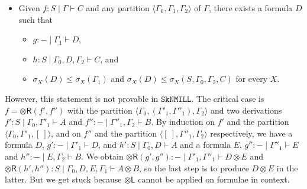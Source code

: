 \documentclass[sn-mathphys-num]{sn-jnl}%
\newcommand{\GG}{\Gamma}
\newcommand{\vd}{\vdash}
\newcommand{\tl}{\otimes \mathsf{L}}
\newcommand{\tr}{\otimes\mathsf{R}}
\newcommand{\ot}{\otimes}
\newcommand{\SkNMILL}{$\mathtt{SkNMILL}$}
\newcommand{\mf}[1]{\mathsf{#1}}
\newcommand{\gs}[1]{\sigma_{X} (#1)}
\theoremstyle{thmstyleone}%
\theoremstyle{thmstyletwo}%
\theoremstyle{thmstylethree}%
\begin{document}
\begin{itemize}
  \item[\ ] Given $f: S \mid \Gamma \vd C$ and any partition $\langle \GG_0,\GG_1, \GG_2 \rangle$ of $\GG$, there exists a formula $D$ such that 
  \begin{itemize}
    \item[--] $g : {-} \mid \GG_1 \vd D$,
    \item[--] $h : S \mid \GG_0, D, \GG_2 \vd C$, and
    \item[--] $\gs{D} \leq \gs{\GG_1}$ and $\gs{D} \leq \gs{S , \GG_0 , \GG_2 , C}$ for every $X$.    
  \end{itemize}
\end{itemize}
However, this statement is not provable in \SkNMILL.
The critical case is $f = \tr (f',f'')$ with the partition $\langle \GG_0, (\GG'_1, \GG''_1), \GG_2\rangle$ and two derivations $f' : S \mid \GG_0 , \GG'_1 \vd A$ and $f'' : {-} \mid \GG''_1 , \GG_2 \vd B$.
By induction on $f'$ and the partition $\langle \GG_0 , \GG'_1, [\ ] \rangle$, and on $f''$ and the partition $\langle [\ ], \GG''_1, \GG_2\rangle$ respectively, we have a formula $D$, $g' : {-} \mid \GG'_1 \vd D$, and $h': S \mid \GG_0 , D \vd A$ and a formula $E$, $g'' : {-} \mid \GG''_1 \vd E$ and $h'': {-} \mid E, \GG_2 \vd B$.
We obtain $\tr (g',g'') : {-} \mid \GG'_1, \GG''_1 \vd D \ot E$ and $\tr (h', h'') : S \mid \GG_0, D, E, \GG_1 \vd A \ot B$, so the last step is to produce $D \ot E$ in the latter.
But we get stuck because $\tl$ cannot be applied on formulae in context.
\end{document}
